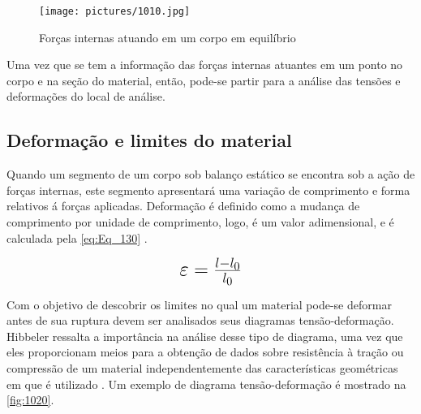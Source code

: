 \begin{figure}[htb]
	\caption{\label{fig:1010} Forças internas atuando em um corpo em equilíbrio}
	\begin{center}
		\texttt{[image: pictures/1010.jpg]}
	\end{center}
\end{figure}

Uma vez que se tem a informação das forças internas atuantes em um ponto no corpo e na seção do material, então, pode-se partir para a análise das tensões
e deformações do local de análise.

\subsection{Deformação e limites do material}

Quando um segmento de um corpo sob balanço estático se encontra sob a ação de forças internas, este segmento apresentará uma variação de comprimento e forma relativos
á forças aplicadas. Deformação é definido como a mudança de comprimento por unidade de comprimento, logo, é um valor adimensional,
e é calculada pela \autoref{eq:Eq_130} \autocite{Norton2011}.

\begin{equation}\label{eq:Eq_130}%
\mbox{\fontsize{17.28}{21.6}\selectfont\( %
\varepsilon = \frac{l - l_0}{l_0}
\)} %
\end{equation}

%
%
%

\hfill

Com o objetivo de descobrir os limites no qual um material pode-se deformar antes de sua ruptura devem ser analisados seus diagramas tensão-deformação.
Hibbeler ressalta a importância na análise desse tipo de diagrama, uma vez que eles proporcionam meios para a obtenção de dados sobre resistência à tração
ou compressão de um material independentemente das características geométricas em que é utilizado \autocite{Hibbeler2010}.
Um exemplo de diagrama tensão-deformação é mostrado na \autoref{fig:1020}.

